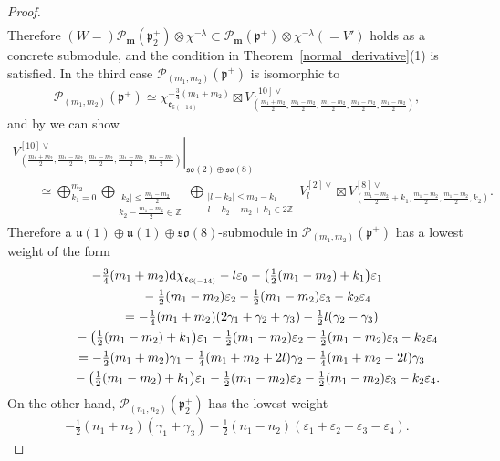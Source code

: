 \documentclass[pdftex]{sigma}
\numberwithin{equation}{section}
\newcommand{\bm}{\mathbf{m}}
\newcommand{\BZ}{\mathbb{Z}}
\newcommand{\fp}{\mathfrak{p}}
\newcommand{\cP}{\mathcal{P}}
\newcommand{\ve}{\varepsilon}
\begin{document}
\begin{proof}
\begin{gather*}
\end{gather*}
Therefore $(W=)\cP_\bm(\fp^+_2)\otimes\chi^{-\lambda}\subset\cP_\bm(\fp^+)\otimes\chi^{-\lambda}(=V')$ holds as a concrete submodule,
and the condition in Theorem~\ref{normal_derivative}(1) is satisfied.
In the third case $\cP_{(m_1,m_2)}(\fp^+)$ is isomorphic to
\begin{gather*} \cP_{(m_1,m_2)}(\fp^+)\simeq \chi_{\mathfrak{e}_{6(-14)}}^{-\frac{3}{4}(m_1+m_2)}\boxtimes
V_{\left(\frac{m_1+m_2}{2},\frac{m_1-m_2}{2},\frac{m_1-m_2}{2},\frac{m_1-m_2}{2},\frac{m_1-m_2}{2}\right)}^{[10]\vee}, \end{gather*}
and by \cite[Theorem 1.1]{T} we can show
\begin{gather*}
\left.V_{\left(\frac{m_1+m_2}{2},\frac{m_1-m_2}{2},\frac{m_1-m_2}{2},\frac{m_1-m_2}{2},\frac{m_1-m_2}{2}\right)}^{[10]\vee}
\right|_{\mathfrak{so}(2)\oplus\mathfrak{so}(8)}\\
\qquad{} \simeq\bigoplus_{k_1=0}^{m_2}\bigoplus_{\substack{|k_2|\le\frac{m_1-m_2}{2}\\k_2-\frac{m_1-m_2}{2}\in\BZ}}
\bigoplus_{\substack{|l-k_2|\le m_2-k_1\\ l-k_2-m_2+k_1\in 2\BZ}}
V_l^{[2]\vee}\boxtimes V_{\left(\frac{m_1-m_2}{2}+k_1,\frac{m_1-m_2}{2},\frac{m_1-m_2}{2},k_2\right)}^{[8]\vee}.
\end{gather*}
Therefore a $\mathfrak{u}(1)\oplus\mathfrak{u}(1)\oplus\mathfrak{so}(8)$-submodule in $\cP_{(m_1,m_2)}(\fp^+)$ has a lowest weight of the form
\begin{gather*}
 -\tfrac{3}{4}(m_1+m_2){\rm d}\chi_{\mathfrak{e}_{6(-14)}}-l\ve_0
-\big(\tfrac12 (m_1-m_2)+k_1\big)\ve_1\\
\qquad\quad{} -\tfrac12 (m_1-m_2) \ve_2-\tfrac12 (m_1-m_2)\ve_3-k_2\ve_4\\
\qquad {} =-\tfrac{1}{4}(m_1+m_2)(2\gamma_1+\gamma_2+\gamma_3)-\tfrac{1}{2}l(\gamma_2-\gamma_3)\\
\qquad\quad{} -\big(\tfrac12 (m_1-m_2)+k_1\big)\ve_1-\tfrac12 (m_1-m_2) \ve_2-\tfrac12 (m_1-m_2)\ve_3-k_2\ve_4\\
\qquad{} =-\tfrac{1}{2}(m_1+m_2)\gamma_1-\tfrac{1}{4}(m_1+m_2+2l)\gamma_2-\tfrac{1}{4}(m_1+m_2-2l)\gamma_3\\
\qquad\quad{} -\big(\tfrac12 (m_1-m_2)+k_1\big)\ve_1-\tfrac12 (m_1-m_2)\ve_2-\tfrac12 (m_1-m_2)\ve_3-k_2\ve_4.
\end{gather*}
On the other hand, $\cP_{(n_1,n_2)}(\fp^+_2)$ has the lowest weight
\begin{gather*} -\tfrac{1}{2}(n_1+n_2)(\gamma_1+\gamma_3)-\tfrac{1}{2}(n_1-n_2)(\ve_1+\ve_2+\ve_3-\ve_4). \end{gather*}

\end{proof}
\end{document}
